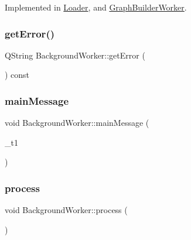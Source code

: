 Implemented in \mbox{\hyperlink{class_loader_abdb17a0ee918aa7b19d53b9c909cfb60}{Loader}}, and \mbox{\hyperlink{class_graph_builder_worker_a60151549187952017cad7da0f8a4749a}{Graph\+Builder\+Worker}}.

\mbox{\label{class_background_worker_a206b6e5d08e36bc964287469566b9af3}} 
\subsubsection{\texorpdfstring{getError()}{getError()}}
{\footnotesize\ttfamily Q\+String Background\+Worker\+::get\+Error (\begin{DoxyParamCaption}{ }\end{DoxyParamCaption}) const\hspace{0.3cm}{\ttfamily [inline]}}

\mbox{\label{class_background_worker_a22b31deec52f477dee5837f80009988a}} 
\subsubsection{\texorpdfstring{mainMessage}{mainMessage}}
{\footnotesize\ttfamily void Background\+Worker\+::main\+Message (\begin{DoxyParamCaption}\item[{Q\+String}]{\+\_\+t1 }\end{DoxyParamCaption})\hspace{0.3cm}{\ttfamily [signal]}}

\mbox{\label{class_background_worker_ab6dafa5034e430b57db5a19c11ccf201}} 
\subsubsection{\texorpdfstring{process}{process}}
{\footnotesize\ttfamily void Background\+Worker\+::process (\begin{DoxyParamCaption}{ }\end{DoxyParamCaption})\hspace{0.3cm}{\ttfamily [slot]}}


